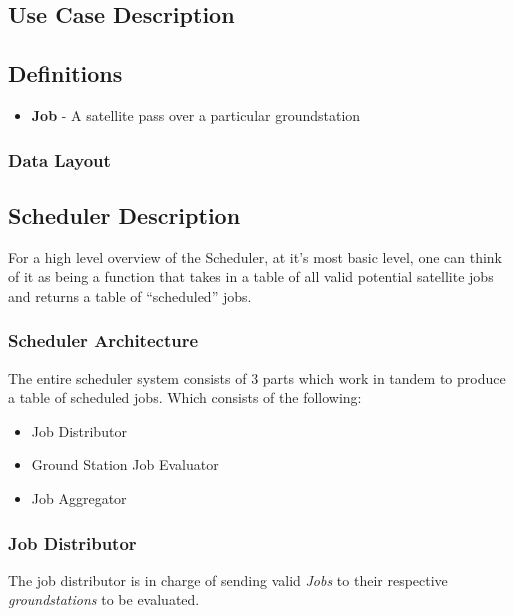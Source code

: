 \documentclass{article}
\begin{document}
\subsection{Use Case Description}

\subsection{Definitions}

\begin{itemize}
  \item \textbf{Job} - A satellite pass over a particular groundstation
\end{itemize}

\subsubsection{Data Layout}


\subsection{Scheduler Description}

For a high level overview of the Scheduler, at it's most basic level, one can
think of it as being a function that takes in a table of all valid potential
satellite jobs and returns a table of ``scheduled'' jobs.

\subsubsection{Scheduler Architecture}

The entire scheduler system consists of 3 parts which work in tandem to produce
a table of scheduled jobs. Which consists of the following:

\begin{itemize}
\item Job Distributor
\item Ground Station Job Evaluator
\item Job Aggregator
\end{itemize}

\subsubsection{Job Distributor}

The job distributor is in charge of sending valid \textit{Jobs} to their
respective \textit{groundstations} to be evaluated.
\end{document}

